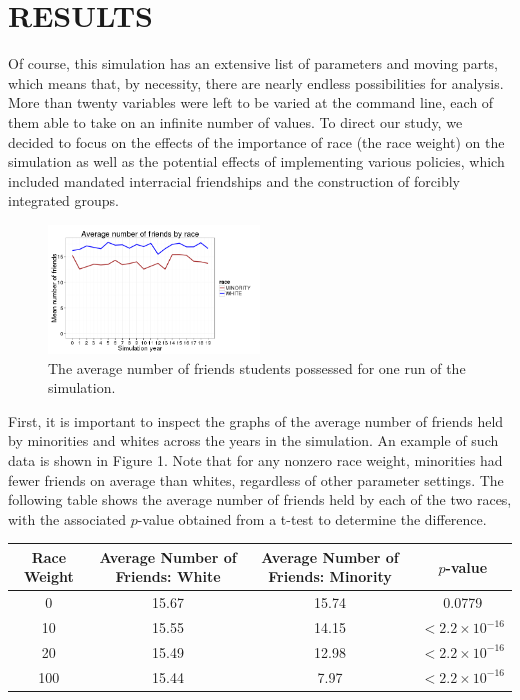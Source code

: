 
\section{RESULTS}
\label{sec:results}

Of course, this simulation has an extensive list of parameters and moving parts, which means that, by necessity, 
there are nearly endless possibilities for analysis. More than twenty variables were left to be varied at the command line, 
each of them able to take on an infinite number of values. To direct our study, we decided to focus on the effects of the 
importance of race (the race weight) on the simulation as well as the potential effects of implementing various policies, 
which included mandated interracial friendships and the construction of forcibly integrated groups.

\begin{figure}[h]\label{AvgFriends}
  \centering
    \includegraphics[width=0.5\textwidth]{avgNumberOfFriendsFromCaladan.png}
      \caption{The average number of friends students possessed for one run of the simulation.}
\end{figure}
First, it is important to inspect the graphs of the average number of friends held by minorities and whites across the years 
in the simulation. An example of such data is shown in Figure 1. Note that for any nonzero race weight, 
minorities had fewer friends on average than whites, regardless of other parameter settings. The following table shows the average 
number of friends held by each of the two races, with the associated $p$-value obtained from a t-test to determine the difference.
\begin{center}
\begin{tabular}{|c|c|c|c|}
\hline
Race Weight & Average Number of Friends: White & Average Number of Friends: Minority & $p$-value\\
\hline
0 & 15.67 & 15.74 & 0.0779\\
10 & 15.55 & 14.15 & $<2.2\times 10^{-16}$\\
20 & 15.49 & 12.98 & $<2.2\times 10^{-16}$\\
100 & 15.44 & 7.97 & $<2.2\times 10^{-16}$\\
\hline
\end{tabular}
\end{center}~~\\

